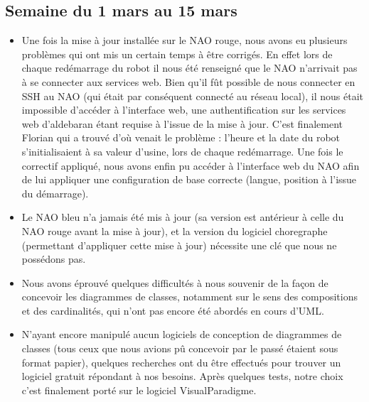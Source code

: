   \subsection{Semaine du 1 mars au 15 mars}
  \label{sub:Semaine du 1 mars au 15 mars}
    \begin{itemize}
      \item Une fois la mise à jour installée sur le NAO rouge, nous avons eu plusieurs problèmes qui ont mis un certain temps à être corrigés.
      En effet lors de chaque redémarrage du robot il nous été renseigné que le NAO n’arrivait pas à se connecter aux services web.
      Bien qu’il fût possible de nous connecter en SSH au NAO (qui était par conséquent connecté au réseau local),
      il nous était impossible d’accéder à l’interface web, une authentification sur les services web d’aldebaran étant requise à l’issue de la mise à jour.
      C’est finalement Florian qui a trouvé d’où venait le problème : l’heure et la date du robot s’initialisaient à sa valeur d’usine, lors de chaque redémarrage.
      Une fois le correctif appliqué, nous avons enfin pu accéder à l’interface web du NAO afin de lui appliquer une configuration de base correcte (langue, position à l'issue du démarrage).
      \item Le NAO bleu n’a jamais été mis à jour (sa version est antérieur à celle du NAO rouge avant la mise à jour),
      et la version du logiciel choregraphe (permettant d’appliquer cette mise à jour) nécessite une clé que nous ne possédons pas.
      \item Nous avons éprouvé quelques difficultés à nous souvenir de la façon de concevoir les diagrammes de classes,
      notamment sur le sens des compositions et des cardinalités, qui n'ont pas encore été abordés en cours d'UML.
      \item N'ayant encore manipulé aucun logiciels de conception de diagrammes de classes (tous ceux que nous avions pû concevoir par le passé étaient sous format papier),
      quelques recherches ont du être effectués pour trouver un logiciel gratuit répondant à nos besoins.
      Après quelques tests, notre choix c'est finalement porté sur le logiciel VisualParadigme.
    \end{itemize}



